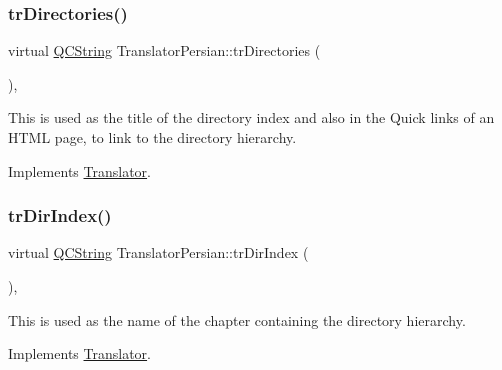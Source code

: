 \mbox{\label{class_translator_persian_a8c198763218e8e9a6f391f409e1146f5}} 
\subsubsection{\texorpdfstring{trDirectories()}{trDirectories()}}
{\footnotesize\ttfamily virtual \mbox{\hyperlink{class_q_c_string}{Q\+C\+String}} Translator\+Persian\+::tr\+Directories (\begin{DoxyParamCaption}{ }\end{DoxyParamCaption})\hspace{0.3cm}{\ttfamily [inline]}, {\ttfamily [virtual]}}

This is used as the title of the directory index and also in the Quick links of an H\+T\+ML page, to link to the directory hierarchy. 

Implements \mbox{\hyperlink{class_translator}{Translator}}.

\mbox{\label{class_translator_persian_a20accdb49d53063a089c569419215b4e}} 
\subsubsection{\texorpdfstring{trDirIndex()}{trDirIndex()}}
{\footnotesize\ttfamily virtual \mbox{\hyperlink{class_q_c_string}{Q\+C\+String}} Translator\+Persian\+::tr\+Dir\+Index (\begin{DoxyParamCaption}{ }\end{DoxyParamCaption})\hspace{0.3cm}{\ttfamily [inline]}, {\ttfamily [virtual]}}

This is used as the name of the chapter containing the directory hierarchy. 

Implements \mbox{\hyperlink{class_translator}{Translator}}.

\mbox{\label{class_translator_persian_a6155500222ad9ad5047c8933dc290dfe}} 
